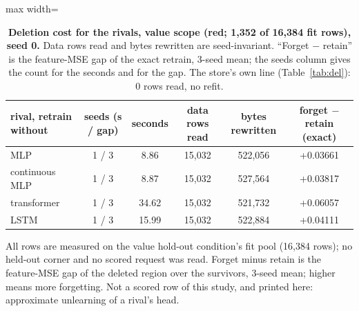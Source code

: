 \documentclass{article} %
\begin{document}
\begin{table}[h]
\centering\small
\caption{\textbf{Deletion cost for the rivals, value scope (red; 1,352 of 16,384 fit rows), %
seed 0.} Data rows read and bytes rewritten are seed-invariant. ``Forget $-$ retain'' is the
feature-MSE gap of the exact retrain, 3-seed mean; the seeds column gives the count for the
seconds and for the gap. The store's own line (Table~\ref{tab:del}):
0 rows read, no refit.}
\label{tab:rivals-del}
\begin{adjustbox}{max width=\linewidth}\begin{tabular}{lccccc}
\toprule
rival, retrain without & seeds (s / gap) & seconds & data rows read & bytes rewritten & forget $-$ retain (exact) \\
\midrule
MLP & 1 / 3 & 8.86 & 15,032 & 522,056 & +0.03661 \\
continuous MLP & 1 / 3 & 8.87 & 15,032 & 527,564 & +0.03817 \\
transformer & 1 / 3 & 34.62 & 15,032 & 521,732 & +0.06057 \\
LSTM & 1 / 3 & 15.99 & 15,032 & 522,884 & +0.04111 \\
\bottomrule
\end{tabular}\end{adjustbox}
\end{table}



All rows are measured on the value hold-out condition's fit pool (16,384 rows); no held-out corner %
and no scored request was read. Forget minus retain is the feature-MSE gap of the deleted region
over the survivors, 3-seed mean; higher means more forgetting. Not a scored row of this study,
and printed here: approximate unlearning of a rival's head.
\end{document}
